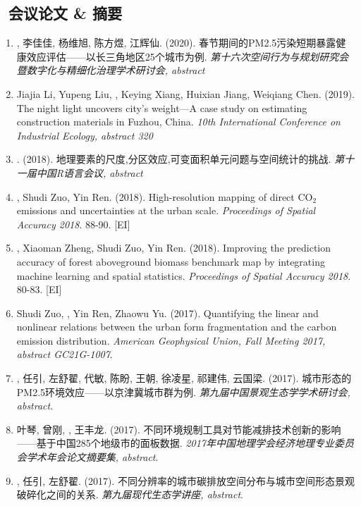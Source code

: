 \subsection*{\texorpdfstring{\faBook\ 会议论文 \& 摘要}{会议论文 \& 摘要}}
\begin{enumerate}
\item
    {}, 李佳佳, 杨维旭, 陈方煜, 江辉仙. (2020).
    春节期间的PM2.5污染短期暴露健康效应评估——以长三角地区25个城市为例.
    \textit{第十六次空间行为与规划研究会暨数字化与精细化治理学术研讨会, abstract}
\item
    Jiajia Li, Yupeng Liu, \Shaoqing, Keying Xiang, Huixian Jiang, Weiqiang Chen. (2019).
    The night light uncovers city's weight—A case study on estimating construction materials in Fuzhou, China.
    \textit{10th International Conference on Industrial Ecology, abstract 320}
\item
    {}. (2018).
    地理要素的尺度,分区效应,可变面积单元问题与空间统计的挑战.
    \textit{第十一届中国R语言会议, abstract}
\item
    \Shaoqing, Shudi Zuo, Yin Ren. (2018).
    High-resolution mapping of direct CO$_2$ emissions and uncertainties at the urban scale.
    \textit{Proceedings of Spatial Accuracy 2018}. 88-90. [EI]
\item
    \Shaoqing\CF, Xiaoman Zheng, Shudi Zuo, Yin Ren. (2018).
    Improving the prediction accuracy of forest aboveground biomass benchmark map by integrating machine learning and spatial statistics.
    \textit{Proceedings of Spatial Accuracy 2018}. 80-83. [EI]
\item
    Shudi Zuo, \Shaoqing, Yin Ren, Zhaowu Yu. (2017).
    Quantifying the linear and nonlinear relations between the urban form fragmentation and the carbon emission distribution.
    \textit{American Geophysical Union, Fall Meeting 2017, abstract GC21G-1007}.
\item
    {}, 任引, 左舒翟, 代敏, 陈盼, 王朝, 徐凌星, 祁建伟, 云国梁. (2017).
    城市形态的PM2.5环境效应——以京津冀城市群为例.
    \textit{第九届中国景观生态学学术研讨会, abstract}.
\item
    叶琴, 曾刚, {}, 王丰龙. (2017).
    不同环境规制工具对节能减排技术创新的影响——基于中国285个地级市的面板数据.
    \textit{2017年中国地理学会经济地理专业委员会学术年会论文摘要集, abstract}.
\item
    {}, 任引, 左舒翟. (2017).
    不同分辨率的城市碳排放空间分布与城市空间形态景观破碎化之间的关系.
    \textit{第九届现代生态学讲座, abstract}.

\end{enumerate}
